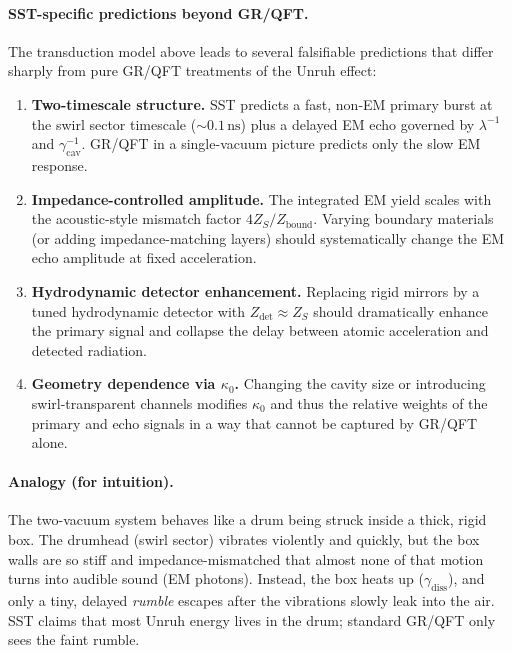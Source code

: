 \documentclass[10pt,reprint,aps,onecolumn,nofootinbib]{revtex4-2}
\begin{document}
    \paragraph*{SST-specific predictions beyond GR/QFT.}

        The transduction model above leads to several falsifiable predictions that
        differ sharply from pure GR/QFT treatments of the Unruh effect:
        \begin{enumerate}
            \item \textbf{Two-timescale structure.}
            SST predicts a fast, non-EM primary burst at the swirl sector
            timescale (\(\sim 0.1\,\mathrm{ns}\)) plus a delayed EM echo
            governed by \(\lambda^{-1}\) and \(\gamma_{\mathrm{cav}}^{-1}\).
            GR/QFT in a single-vacuum picture predicts only the slow EM response.
            \item \textbf{Impedance-controlled amplitude.}
            The integrated EM yield scales with the acoustic-style mismatch
            factor \(4 Z_S/Z_{\mathrm{bound}}\). Varying boundary materials
            (or adding impedance-matching layers) should systematically change
            the EM echo amplitude at fixed acceleration.
            \item \textbf{Hydrodynamic detector enhancement.}
            Replacing rigid mirrors by a tuned hydrodynamic detector with
            \(Z_{\mathrm{det}} \approx Z_S\) should dramatically enhance the
            primary signal and collapse the delay between atomic acceleration
            and detected radiation.
            \item \textbf{Geometry dependence via \(\kappa_0\).}
            Changing the cavity size or introducing swirl-transparent channels
            modifies \(\kappa_0\) and thus the relative weights of the primary
            and echo signals in a way that cannot be captured by GR/QFT alone.
        \end{enumerate}

    \paragraph*{Analogy (for intuition).}
        The two-vacuum system behaves like a drum being struck inside a thick,
        rigid box. The drumhead (swirl sector) vibrates violently and quickly, but
        the box walls are so stiff and impedance-mismatched that almost none of that
        motion turns into audible sound (EM photons). Instead, the box heats up
        (\(\gamma_{\mathrm{diss}}\)), and only a tiny, delayed \emph{rumble} escapes
        after the vibrations slowly leak into the air. SST claims that most Unruh
        energy lives in the drum; standard GR/QFT only sees the faint rumble.
\end{document}
